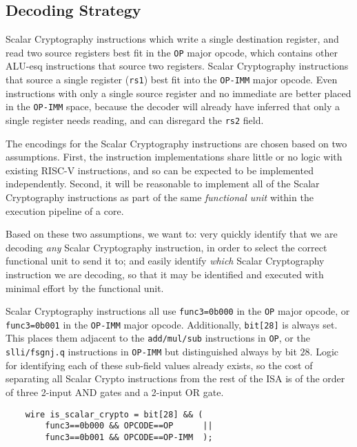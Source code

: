 \subsection{Decoding Strategy}

Scalar Cryptography instructions which write a single
destination register, and read two source registers
best fit in the {\tt OP} major opcode, which contains other ALU-esq
instructions that source two registers.
Scalar Cryptography instructions that source a single register ({\tt rs1})
best fit into the {\tt OP-IMM} major opcode.
Even instructions with only a single source register and no immediate are
better placed in the {\tt OP-IMM} space, because the decoder will already
have inferred that only a single register needs reading, and can disregard
the {\tt rs2} field.

The encodings for the Scalar Cryptography instructions are chosen based on
two assumptions.
First, the instruction implementations share little or no logic with existing
RISC-V instructions, and so can be expected to be implemented
independently.
Second, it will be reasonable to implement all of the Scalar Cryptography
instructions as part of the same {\em functional unit} within the
execution pipeline of a core.

Based on these two assumptions, we want to:
very quickly identify
that we are decoding {\em any} Scalar Cryptography instruction, in order to
select the correct functional unit to send it to; and
easily identify {\em which} Scalar Cryptography instruction we are decoding,
so that it may be identified and executed with minimal effort by the
functional unit.

Scalar Cryptography instructions all use {\tt func3=0b000} in the {\tt OP}
major opcode, or {\tt func3=0b001} in the {\tt OP-IMM} major opcode.
Additionally, {\tt bit[28]} is always set.
This places them adjacent to the {\tt add/mul/sub} instructions in {\tt OP},
or the {\tt slli/fsgnj.q} instructions in {\tt OP-IMM} 
but distinguished always by bit $28$.
Logic for identifying each of these sub-field values already exists, so
the cost of separating all Scalar Crypto instructions from the rest of the
ISA is of the order of three 2-input AND gates and a 2-input OR gate.

\begin{verbatim}
    wire is_scalar_crypto = bit[28] && (
        func3==0b000 && OPCODE==OP      ||
        func3==0b001 && OPCODE==OP-IMM  );
\end{verbatim}

